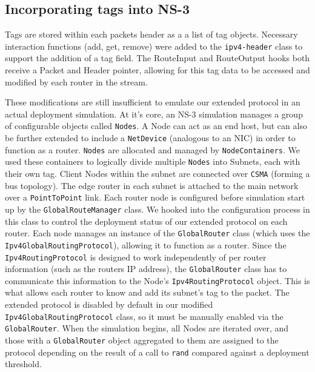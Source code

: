 \documentclass[12pt]{article} %
\newcommand{\prettycode}[1]
{\lstinline[basicstyle=\ttfamily]{#1}}
\begin{document}
\subsection{Incorporating tags into NS-3}

Tags are stored within each packets header as a a list of tag objects. Necessary interaction functions (add, get, remove) were added to the \prettycode{ipv4-header} class to support the addition of a tag field. The RouteInput and RouteOutput hooks both receive a Packet and Header pointer, allowing for this tag data to be accessed and modified by each router in the stream. 

These modifications are still insufficient to emulate our extended protocol in an actual deployment simulation. At it's core, an NS-3 simulation manages a group of configurable objects called \prettycode{Nodes}. A Node can act as an end host, but can also be further extended to include a \prettycode{NetDevice} (analogous to an NIC) in order to function as a router. \prettycode{Nodes} are allocated and managed by \prettycode{NodeContainers}. We used these containers to logically divide multiple \prettycode{Nodes} into Subnets, each with their own tag. Client Nodes within the subnet are connected over \prettycode{CSMA} (forming a bus topology). The edge router in each subnet is attached to the main network over a \prettycode{PointToPoint} link. Each router node is configured before simulation start up by the \prettycode{GlobalRouteManager} class. We hooked into the configuration process in this class to control the deployment status of our extended protocol on each router. Each node manages an instance of the \prettycode{GlobalRouter} class (which uses the \prettycode{Ipv4GlobalRoutingProtocol}), allowing it to function as a router. Since the \prettycode{Ipv4RoutingProtocol} is designed to work independently of per router information (such as the routers IP address), the \prettycode{GlobalRouter} class has to communicate this information to the Node's \prettycode{Ipv4RoutingProtocol} object. This is what allows each router to know and add its subnet's tag to the packet. The extended protocol is disabled by default in our modified \prettycode{Ipv4GlobalRoutingProtocol} class, so it must be manually enabled via the \prettycode{GlobalRouter}. When the simulation begins, all Nodes are iterated over, and those with a \prettycode{GlobalRouter} object aggregated to them are assigned to the protocol depending on the result of a call to \prettycode{rand} compared against a deployment threshold.
\end{document}
